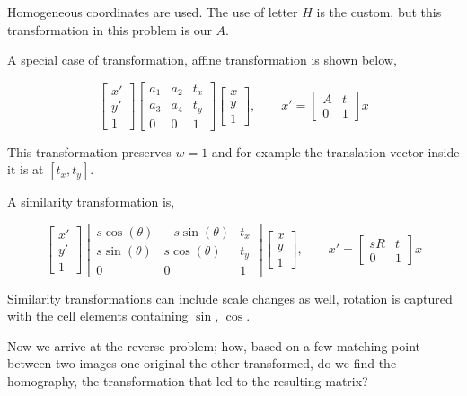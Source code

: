 \documentclass{article}
\begin{document}
Homogeneous coordinates are used. The use of letter $H$ is the custom, but this
transformation in this problem is our $A$.

A special case of transformation, affine transformation is shown below,

$$ 
\left[\begin{array}{r} x' \\ y' \\ 1 \end{array}\right]
\left[\begin{array}{rrr}
a_1 & a_2 & t_x \\ a_3 & a_4 & t_y \\ 0 & 0 & 1
\end{array}\right]
\left[\begin{array}{r} x \\ y \\ 1 \end{array}\right],
\qquad
x' = \left[\begin{array}{rr} A & t \\ 0 & 1 \end{array}\right] x
$$

This transformation preserves $w = 1$ and for example the translation vector
inside it is at $[t_x, t_y]$.

A similarity transformation is,

$$ 
\left[\begin{array}{r} x' \\ y' \\ 1 \end{array}\right]
\left[\begin{array}{rrr}
s\cos(\theta) & -s\sin(\theta) & t_x \\ 
s\sin(\theta) & s\cos(\theta) & t_y \\ 
0 & 0 & 1
\end{array}\right]
\left[\begin{array}{r} x \\ y \\ 1 \end{array}\right],
\qquad
x' = \left[\begin{array}{rr}
sR & t \\ 0 & 1
\end{array}\right] x
$$

Similarity transformations can include scale changes as well, rotation is
captured with the cell elements containing $\sin$, $\cos$.

Now we arrive at the reverse problem; how, based on a few matching point between
two images one  original the other transformed, do we find the homography, the
transformation that led to the resulting matrix?
\end{document}
